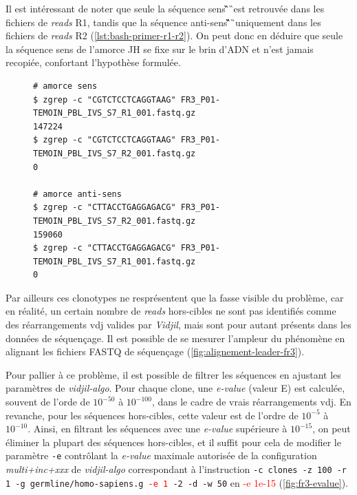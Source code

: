 Il est intéressant de noter que seule la séquence sens \C\G\T\C\T\C\C\T\C\A\G\G\T\A\A\G\ est retrouvée dans les fichiers de \textit{reads} 
R1, tandis que la séquence anti-sens \C\T\T\A\C\C\T\G\A\G\G\A\G\A\C\G\ uniquement dans les fichiers de \textit{reads} 
R2 (\autoref{lst:bash-primer-r1-r2}). On peut donc en déduire que seule la séquence sens de l'amorce JH se fixe sur 
le brin d'ADN et n'est jamais recopiée, confortant l'hypothèse formulée.


\begin{figure}[H]
\begin{lstlisting}[language=custombash, 
    caption={Commande Bash et résultat de la recherche des séquences des amorces dans les fichiers FASTQ R1 et R2.},
    label={lst:bash-primer-r1-r2},
basicstyle=\ttfamily\small]
# amorce sens
$ zgrep -c "CGTCTCCTCAGGTAAG" FR3_P01-TEMOIN_PBL_IVS_S7_R1_001.fastq.gz
147224
$ zgrep -c "CGTCTCCTCAGGTAAG" FR3_P01-TEMOIN_PBL_IVS_S7_R2_001.fastq.gz
0

# amorce anti-sens
$ zgrep -c "CTTACCTGAGGAGACG" FR3_P01-TEMOIN_PBL_IVS_S7_R2_001.fastq.gz
159060
$ zgrep -c "CTTACCTGAGGAGACG" FR3_P01-TEMOIN_PBL_IVS_S7_R1_001.fastq.gz
0
\end{lstlisting}
\end{figure}
    
Par ailleurs ces clonotypes ne resprésentent que la fasse visible du problème, car en réalité, un certain nombre de \textit{reads} 
hors-cibles ne sont pas identifiés comme des réarrangements \gls{vdj} valides par \textit{Vidjil}, mais sont pour autant présents 
dans les données de séquençage. Il est possible de  se mesurer l'ampleur du phénomène en alignant les fichiers FASTQ de séquençage 
(\autoref{fig:alignement-leader-fr3}).



Pour pallier à ce problème, il est possible de filtrer les séquences en ajustant les paramètres de \textit{vidjil-algo}.
Pour chaque clone, une \textit{e-value} (valeur E) est calculée, souvent de l'orde de $10^{-50}$ à $10^{-100}$, dans le 
cadre de vrais réarrangements \gls{vdj}. En revanche, pour les séquences hors-cibles, cette valeur est de l'ordre de $10^{-5}$ à $10^{-10}$. 
Ainsi, en filtrant les séquences avec une \textit{e-value} supérieure à $10^{-15}$, on peut éliminer la plupart des séquences hors-cibles, et 
il suffit pour cela de modifier le paramètre \texttt{-e} contrôlant la \textit{e-value} maximale autorisée de la configuration \textit{multi+inc+xxx} 
de \textit{vidjil-algo} correspondant à l'instruction \texttt{-c clones -z 100 -r 1 -g germline/homo-sapiens.g \textcolor{red}{-e 1} -2 -d -w 50} 
en \textcolor{red}{-e 1e-15} (\autoref{fig:fr3-evalue}).

